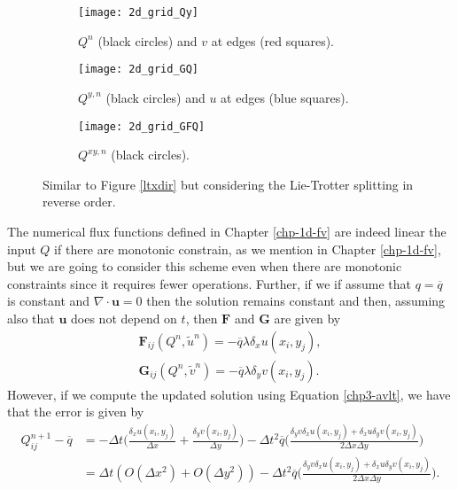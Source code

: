 \begin{figure}[!htb]
	\centering
	\begin{subfigure}{0.3\textwidth}
		\centering
		\texttt{[image: 2d\_grid\_Qy]}
		\caption{$Q^n$ (black circles) and $v$ at edges (red squares). \label{lt-Qy}}
	\end{subfigure}
	\begin{subfigure}{0.3\textwidth}
		\centering
		\texttt{[image: 2d\_grid\_GQ]}
		\caption{$Q^{y,n}$ (black circles) and $u$ at edges (blue squares).\label{lt-GQy} }
	\end{subfigure}
	\begin{subfigure}{0.3\textwidth}
		\centering
		\texttt{[image: 2d\_grid\_GFQ]}
		\caption{$Q^{xy,n}$ (black circles). \label{lt-FGQy}}
	\end{subfigure}
	\caption{Similar to Figure \ref{ltxdir} but considering the Lie-Trotter splitting in reverse order.}
\end{figure}
The numerical flux functions defined in Chapter \ref{chp-1d-fv} are indeed linear the input $Q$ if there are monotonic constrain, 
as we mention in Chapter \ref{chp-1d-fv}, but we are going to consider this scheme even when there are monotonic constraints since it requires fewer operations.
Further, if we if assume that $q = \overline{q}$ is constant and $\nabla \cdot \boldsymbol{u} = 0$ then the solution
remains constant and then, assuming also that $\boldsymbol{u}$ does not depend on $t$, then $\mathbf{F}$ and $\mathbf{G}$ are given by
\begin{align*}
	\mathbf{F}_{ij}(Q^n,\tilde{u}^n) = -\overline{q} \lambda {\delta_x} u(x_i,y_j),\\
	\mathbf{G}_{ij}(Q^n,\tilde{v}^n) = -\overline{q} \lambda {\delta_y} v(x_i,y_j).
\end{align*}
However, if we compute the updated solution using Equation \eqref{chp3-avlt}, we have that the error is given by
\begin{align}
	\label{chp3-avlt-error}
	Q^{n+1}_{ij} - \overline{q} &= 
	-\Delta t \bigg(\frac{\delta_x u(x_i,y_j)}{\Delta x} + 	\frac{\delta_y v(x_i,y_j)}{\Delta y} \bigg)
	-\Delta t^2 \overline{q}\bigg( \frac{\delta_y v \delta_x u(x_i,y_j) + \delta_x u\delta_y v(x_i,y_j)}{2\Delta x \Delta y} \bigg) \\
	&= \Delta t (O(\Delta x^2) + O(\Delta y^2))
	   -\Delta t^2 \overline{q}\bigg( \frac{\delta_y v \delta_x u(x_i,y_j) + \delta_x u\delta_y v(x_i,y_j)}{2\Delta x \Delta y} \bigg).
\end{align}
